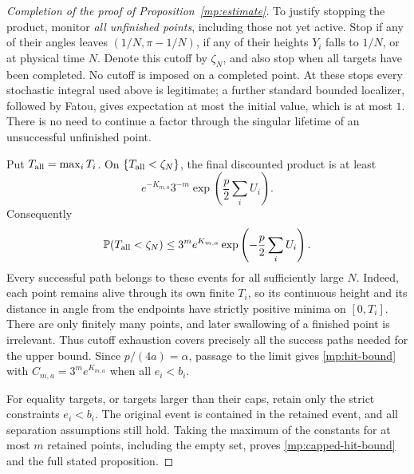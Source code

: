 \begin{proof}[Completion of the proof of Proposition~\ref{mp:estimate}]
To justify stopping the product, monitor \emph{all unfinished points},
including those not yet active. Stop if any of their angles leaves
$(1/N,\pi-1/N)$, if any of their heights $Y_i$ falls to $1/N$, or at
physical time $N$. Denote this cutoff by $\zeta_N$, and also stop when
all targets have been completed. No cutoff is imposed on a completed
point. At these stops every stochastic integral used above is
legitimate; a further standard bounded localizer, followed by Fatou,
gives expectation at most the initial value, which is at most $1$.
There is no need to continue a factor through the singular lifetime of
an unsuccessful unfinished point.

Put $T_{\rm all}=\max_iT_i$. On $\{T_{\rm all}<\zeta_N\}$, the final
discounted product is at least
\[
 e^{-K_{m,a}}3^{-m}\exp\left(\frac p2\sum_iU_i\right).
\]
Consequently
\[
 \mathbb P(T_{\rm all}<\zeta_N)
 \le 3^m e^{K_{m,a}}
                   \exp\left(-\frac p2\sum_iU_i\right).
\]
Every successful path belongs to these events for all sufficiently
large $N$. Indeed, each point remains alive through its own finite
$T_i$, so its continuous height and its distance in angle from the
endpoints have strictly positive minima on $[0,T_i]$. There are only
finitely many points, and later swallowing of a finished point is
irrelevant. Thus cutoff exhaustion covers precisely all the success
paths needed for the upper bound. Since $p/(4a)=\alpha$, passage to
the limit gives \eqref{mp:hit-bound} with
$C_{m,a}=3^m e^{K_{m,a}}$ when all $e_i<b_i$.

For equality targets, or targets larger than their caps, retain only
the strict constraints $e_i<b_i$. The original event is contained in
the retained event, and all separation assumptions still hold.
Taking the maximum of the constants for at most $m$ retained points,
including the empty set, proves \eqref{mp:capped-hit-bound} and the
full stated proposition.
\end{proof}

